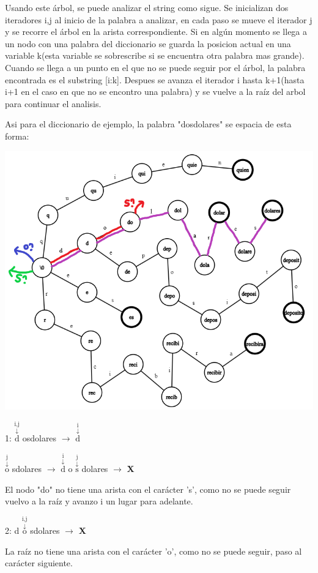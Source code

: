 \documentclass{article}
\newcommand{\flecha}[2] {
    \!\!$\overset{\text{#1}}{\overset{\downarrow}{\text{#2}}}$\!\!
}
\begin{document}
Usando este árbol, se puede analizar el string como sigue. Se inicializan dos iteradores i,j al inicio de la palabra a analizar,
en cada paso se mueve el iterador j y se recorre el árbol en la arista correspondiente. Si en algún momento se llega a un nodo
con una palabra del diccionario se guarda la posicion actual en una variable k(esta variable se sobrescribe si se encuentra otra
palabra mas grande). Cuando se llega a un punto en el que no se puede seguir por el árbol, la palabra encontrada es el substring
[i:k]. Despues se avanza el iterador i hasta k+1(hasta i+1 en el caso en que no se encontro una palabra) y se vuelve a la raíz del 
arbol para continuar el analisis.

Asi para el diccionario de ejemplo, la palabra "dosdolares" se espacia de esta forma:

\includegraphics[scale=0.4]{ejemplo_trie1.png}

{\color{red} 1:} \flecha{i,j}{d}osdolares $\rightarrow$ \flecha{i}d\flecha{j}osdolares $\rightarrow$ \flecha{i}do\flecha{j}sdolares $\rightarrow$ {\color{red} \textbf X}

El nodo "do" no tiene una arista con el carácter 's', como no se puede seguir vuelvo a la raíz y avanzo i un lugar para adelante.

{\color{blue} 2:} d\flecha{i,j}osdolares $\rightarrow$ {\color{red} \textbf X}

La raíz no tiene una arista con el carácter 'o', como no se puede seguir, paso al carácter siguiente.
\end{document}
